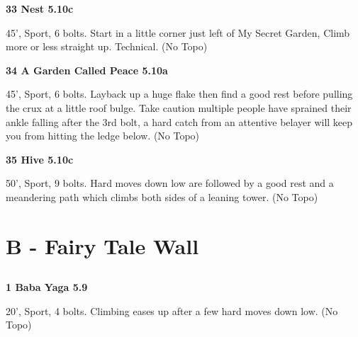 \begin{multicols}{2}
\needspace{1.5cm}
\label{rt:Nest}
\colorbox{RoyalBlue!20}{
\parbox{0.95\linewidth}{
\textbf{
33 Nest 5.10c  
}}}
\begin{adjustwidth}{0.5cm}{}			
45', Sport, 6 bolts. Start in a little corner just left of My Secret Garden, Climb more or less straight up. Technical.
  (No Topo)
\end{adjustwidth}




\needspace{1.5cm}
\label{rt:A Garden Called Peace}
\colorbox{RoyalBlue!20}{
\parbox{0.95\linewidth}{
\textbf{
34 A Garden Called Peace 5.10a  
}}}
\begin{adjustwidth}{0.5cm}{}			
45', Sport, 6 bolts. Layback up a huge flake then find a good rest before pulling the crux at a little roof bulge. Take caution multiple people have sprained their ankle falling after the 3rd bolt, a hard catch from an attentive belayer will keep you from hitting the ledge below.
  (No Topo)
\end{adjustwidth}




\needspace{1.5cm}
\label{rt:Hive}
\colorbox{RoyalBlue!20}{
\parbox{0.95\linewidth}{
\textbf{
35 Hive 5.10c  
}}}
\begin{adjustwidth}{0.5cm}{}			
50', Sport, 9 bolts. Hard moves down low are followed by a good rest and a meandering path which climbs both sides of a leaning tower.
  (No Topo)
\end{adjustwidth}





\newpage

\section{B - Fairy Tale Wall}\label{sa:Fairy Tale Wall}




\needspace{1.5cm}
\subsection*{}\label{bf:}
	


\needspace{1.5cm}
\label{rt:Baba Yaga}
\colorbox{green!20}{
\parbox{0.95\linewidth}{
\textbf{
1 Baba Yaga 5.9  
}}}
\begin{adjustwidth}{0.5cm}{}			
20', Sport, 4 bolts. Climbing eases up after a few hard moves down low.
  (No Topo)
\end{adjustwidth}





\end{multicols}
